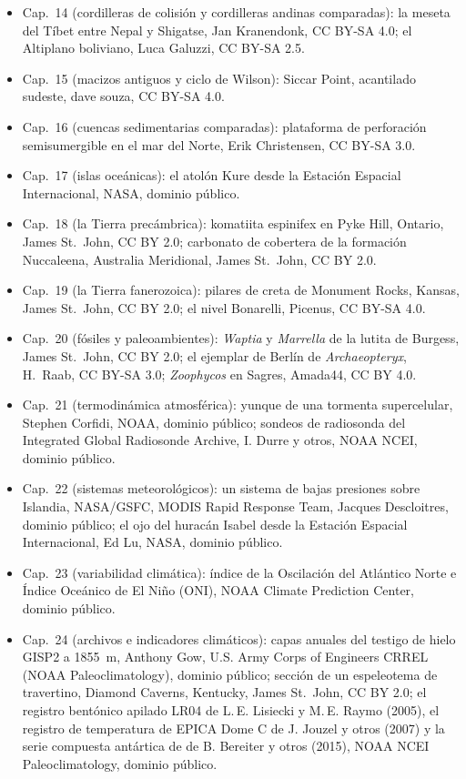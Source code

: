\begin{itemize}
  \item Cap.~14 (cordilleras de colisión y cordilleras andinas comparadas): la meseta del Tíbet entre Nepal y Shigatse, Jan Kranendonk, CC BY-SA 4.0; el Altiplano boliviano, Luca Galuzzi, CC BY-SA 2.5.
  \item Cap.~15 (macizos antiguos y ciclo de Wilson): Siccar Point, acantilado sudeste, dave souza, CC BY-SA 4.0.
  \item Cap.~16 (cuencas sedimentarias comparadas): plataforma de perforación semisumergible en el mar del Norte, Erik Christensen, CC BY-SA 3.0.
  \item Cap.~17 (islas oceánicas): el atolón Kure desde la Estación Espacial Internacional, NASA, dominio público.
  \item Cap.~18 (la Tierra precámbrica): komatiita espinifex en Pyke Hill, Ontario, James St.~John, CC BY 2.0; carbonato de cobertera de la formación Nuccaleena, Australia Meridional, James St.~John, CC BY 2.0.
  \item Cap.~19 (la Tierra fanerozoica): pilares de creta de Monument Rocks, Kansas, James St.~John, CC BY 2.0; el nivel Bonarelli, Picenus, CC BY-SA 4.0.
  \item Cap.~20 (fósiles y paleoambientes): \emph{Waptia} y \emph{Marrella} de la lutita de Burgess, James St.~John, CC BY 2.0; el ejemplar de Berlín de \emph{Archaeopteryx}, H.~Raab, CC BY-SA 3.0; \emph{Zoophycos} en Sagres, Amada44, CC BY 4.0.
  \item Cap.~21 (termodinámica atmosférica): yunque de una tormenta supercelular, Stephen Corfidi, NOAA, dominio público; sondeos de radiosonda del Integrated Global Radiosonde Archive, I. Durre y otros, NOAA NCEI, dominio público.
  \item Cap.~22 (sistemas meteorológicos): un sistema de bajas presiones sobre Islandia, NASA/GSFC, MODIS Rapid Response Team, Jacques Descloitres, dominio público; el ojo del huracán Isabel desde la Estación Espacial Internacional, Ed Lu, NASA, dominio público.
  \item Cap.~23 (variabilidad climática): índice de la Oscilación del Atlántico Norte e Índice Oceánico de El Niño (ONI), NOAA Climate Prediction Center, dominio público.
  \item Cap.~24 (archivos e indicadores climáticos): capas anuales del testigo de hielo GISP2 a 1855~m, Anthony Gow, U.S. Army Corps of Engineers CRREL (NOAA Paleoclimatology), dominio público; sección de un espeleotema de travertino, Diamond Caverns, Kentucky, James St.~John, CC BY 2.0; el registro bentónico apilado LR04 de L.\,E. Lisiecki y M.\,E. Raymo (2005), el registro de temperatura de EPICA Dome C de J. Jouzel y otros (2007) y la serie compuesta antártica de  de B. Bereiter y otros (2015), NOAA NCEI Paleoclimatology, dominio público.

\end{itemize}
